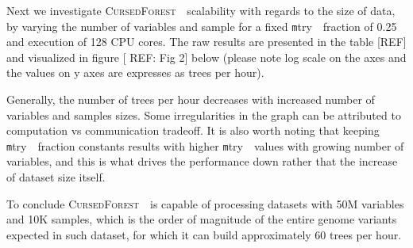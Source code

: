 \documentclass[10pt,letterpaper]{article}
\newcommand{\cursedforest}{\textsc{CursedForest}\ }
\newcommand{\mtry}{{\texttt mtry\ }}
\begin{document}
Next we investigate \cursedforest\ scalability with regards to the size of data, by varying the number of variables and
sample for a fixed \mtry\ fraction of 0.25 and execution of 128 CPU cores. The raw results are presented in the table
[REF] and visualized in figure [ REF: Fig 2] below (please note log scale on the axes and the values on y axes are
expresses as trees per hour).

Generally, the number of trees per hour decreases with increased number of variables and samples sizes. Some
irregularities in the graph can be attributed to computation vs communication tradeoff. It is also worth noting that
keeping \mtry\ fraction constants results with higher \mtry\ values with growing number of variables, and this is what
drives the performance down rather that the increase of dataset size itself.

To conclude \cursedforest\ is capable of processing datasets with 50M variables and 10K samples, which is the order of
magnitude of the entire genome variants expected in such dataset, for which it can build approximately 60 trees per
hour.
\end{document}
